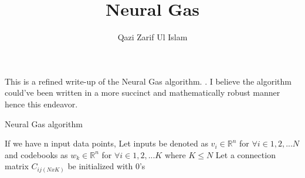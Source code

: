 \documentclass[12pt, letterpaper]{article}
\title{Neural Gas}
\author{Qazi Zarif Ul Islam}
\begin{document}
\maketitle

This is a refined write-up of the Neural Gas algorithm. \cite{NeuralGas}.
I believe the algorithm could've been written in a more succinct and 
mathematically robust manner hence this endeavor.

\begin{algorithm}
    \caption*{Neural Gas algorithm}
    \begin{algorithmic}[1]
        \State If we have n input data points,
        Let inputs be denoted as $v_i \in \mathbb{R}^n$ for $\forall i \in {1,2,...N}$
        and codebooks as $w_k \in \mathbb{R}^n$ for $\forall i \in {1,2,...K}$ where
        $K \leq N$
        \State Let a connection matrix $C_{ij(N x K)}$ be initialized with 0's
    \end{algorithmic}
\end{algorithm}
\printbibliography
\end{document}

